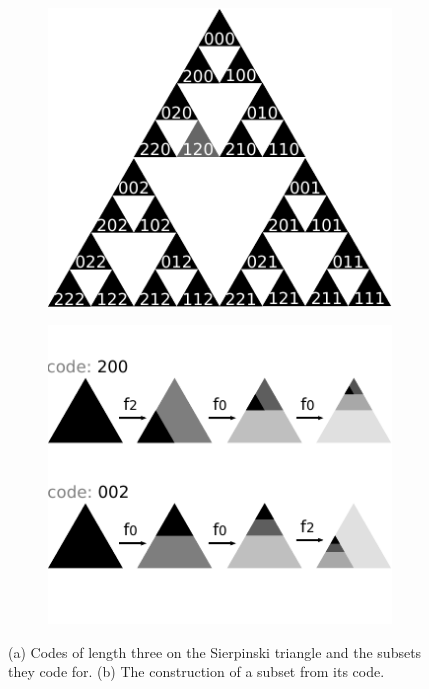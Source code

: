\documentclass[10pt,a4paper,oneside]{article}
\theoremstyle{definition}
\theoremstyle{definition}
\begin{document}
\begin{figure}[b!]
  \centering
  \begin{subfigure}[b]{0.48\textwidth}
    \includegraphics[width=\textwidth]{../img/sierpinski-codes.pdf}
    \caption{}
    \label{fig:sierpinski-codes}
  \end{subfigure}  
  \hspace{0.015\textwidth}
  \begin{subfigure}[b]{0.48\textwidth}
    \includegraphics[width=\textwidth]{../img/code-construction.pdf}
    \caption{}
    \label{fig:code-construction}
  \end{subfigure}

  \caption{\small (a) Codes of length three on the Sierpinski triangle and the subsets they code for. (b) The construction of a subset from its code.}
  \label{figure:codes}
\end{figure}
\end{document}
